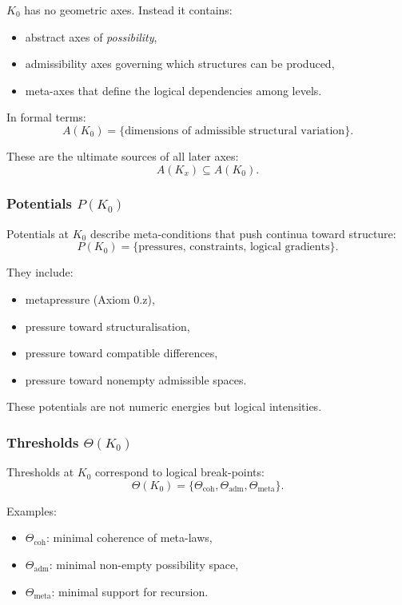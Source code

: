 $K_0$ has no geometric axes. Instead it contains:
\begin{itemize}
    \item abstract axes of \emph{possibility},
    \item admissibility axes governing which structures can be produced,
    \item meta-axes that define the logical dependencies among levels.
\end{itemize}

In formal terms:
\[
A(K_0) = \{ \text{dimensions of admissible structural variation} \}.
\]

These are the ultimate sources of all later axes:
\[
A(K_x) \subseteq A(K_0).
\]

\subsubsection{Potentials \texorpdfstring{$P(K_0)$}{P(K_0)}}

Potentials at $K_0$ describe meta-conditions that push continua toward
structure:
\[
P(K_0) = \{ \text{pressures, constraints, logical gradients} \}.
\]

They include:
\begin{itemize}
    \item metapressure (Axiom 0.z),
    \item pressure toward structuralisation,
    \item pressure toward compatible differences,
    \item pressure toward nonempty admissible spaces.
\end{itemize}

These potentials are not numeric energies but logical intensities.

\subsubsection{Thresholds \texorpdfstring{$\Theta(K_0)$}{\Theta(K_0)}}

Thresholds at $K_0$ correspond to logical break-points:
\[
\Theta(K_0) = \{ \Theta_{\mathrm{coh}}, \Theta_{\mathrm{adm}}, 
                 \Theta_{\mathrm{meta}} \}.
\]

Examples:
\begin{itemize}
    \item $\Theta_{\mathrm{coh}}$: minimal coherence of meta-laws,
    \item $\Theta_{\mathrm{adm}}$: minimal non-empty possibility space,
    \item $\Theta_{\mathrm{meta}}$: minimal support for recursion.
\end{itemize}

